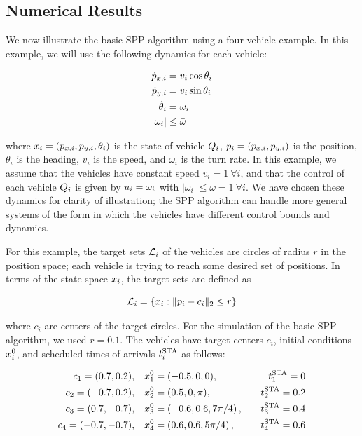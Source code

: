 \subsection{Numerical Results \label{sec:basic_results}}
We now illustrate the basic SPP algorithm using a four-vehicle example. In this example, we will use the following dynamics for each vehicle:

\begin{equation}
\begin{aligned}
\dot{p}_{x,i} &= v_i \cos\theta_i \\
\dot{p}_{y,i} &= v_i \sin\theta_i \\
\dot \theta_i &= \omega_i \\
|\omega_i| &\le \bar\omega
\end{aligned}
\end{equation}

\noindent where $x_i = (p_{x,i}, p_{y,i}, \theta_i)$ is the state of vehicle $Q_i$, $p_i = (p_{x,i}, p_{y,i})$ is the position, $\theta_i$ is the heading, $v_i$ is the speed, and $\omega_i$ is the turn rate. In this example, we assume that the vehicles have constant speed $v_i = 1 ~ \forall i$, and that the control of each vehicle $Q_i$ is given by $u_i = \omega_i$ with $|\omega_i| \le \bar\omega = 1 ~ \forall i$. We have chosen these dynamics for clarity of illustration; the SPP algorithm can handle more general systems of the form in which the vehicles have different control bounds and dynamics. 

For this example, the target sets $\mathcal{L}_i$ of the vehicles are circles of radius $r$ in the position space; each vehicle is trying to reach some desired set of positions. In terms of the state space $x_i$, the target sets are defined as

\begin{equation}
\label{eq:target_sim}
\targetset_i = \{\state_i: \|\pos_i - c_i\|_2 \le r\}
\end{equation}

\noindent where $c_i$ are centers of the target circles. For the simulation of the basic SPP algorithm, we used $r = 0.1$. The vehicles have target centers $c_i$, initial conditions $x_i^0$, and scheduled times of arrivals $t^\text{STA}_i$ as follows:

\begin{equation}
\begin{aligned}
c_1 = (0.7, 0.2), \quad& x_1^0 = (-0.5, 0, 0), \quad & t^\text{STA}_1 = 0 \\
c_2 = (-0.7, 0.2), \quad& x_2^0 = (0.5, 0, \pi), \quad & t^\text{STA}_2 = 0.2 \\
c_3 = (0.7, -0.7), \quad& x_3^0 = \left(-0.6, 0.6, 7\pi/4\right), \quad & t^\text{STA}_3 = 0.4\\
c_4 = (-0.7, -0.7), \quad & x_4^0 = \left(0.6, 0.6, 5\pi/4\right), \quad & t^\text{STA}_4 = 0.6
\end{aligned}
\end{equation}

